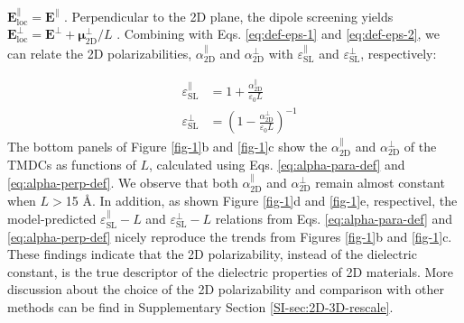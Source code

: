 \documentclass[journal=ancac3,manuscript=article,email=true,hyperref=true,keywords=false]{achemso}
\begin{document}
$\boldsymbol{E}^{\parallel}_{\mathrm{loc}}=\boldsymbol{E}^{\parallel}$
\cite{Markel_2016}. Perpendicular to the 2D plane, the dipole
screening yields
$\boldsymbol{E}_{\mathrm{loc}}^{\perp}=\boldsymbol{E}^{\perp}+\boldsymbol{\mu}_{\mathrm{2D}}^{\perp}/L$
\cite{Meyer_2001_dipole_slab,T_bik_2004}. Combining with
Eqs. \ref{eq:def-eps-1} and \ref{eq:def-eps-2}, we can relate the 2D polarizabilities,
$\alpha_{\mathrm{2D}}^{\parallel}$ and $\alpha_{\mathrm{2D}}^{\perp}$ with $\varepsilon_{\mathrm{SL}}^{\parallel}$ and $\varepsilon_{\mathrm{SL}}^{\perp}$, respectively:
\iffalse
\begin{subequations}
\begin{eqnarray}
  \label{eq:alpha-para-def}
  &\alpha_{\mathrm{2D}}^{\parallel} &= \varepsilon_{0}(\varepsilon_{\mathrm{SL}}^{\parallel} - 1)L\\
  \label{eq:alpha-perp-def}
  &\alpha_{\mathrm{2D}}^{\perp} &= \varepsilon_{0}\left(1 - {\displaystyle \frac{1}{\varepsilon_{\mathrm{SL}}^{\perp}}}\right)L
\end{eqnarray}
\end{subequations}
\fi
\begin{subequations}
\begin{eqnarray}
  \label{eq:alpha-para-def}
  &\varepsilon_{\mathrm{SL}}^{\parallel} &= 1 + \frac{\alpha_{\mathrm{2D}}^{\parallel}}{\varepsilon_{0}L}\\
  \label{eq:alpha-perp-def}
  &\varepsilon_{\mathrm{SL}}^{\perp} &= \left(1 - {\displaystyle \frac{\alpha_{\mathrm{2D}}^{\perp}}{\varepsilon_{\mathrm{0}} L}} \right)^{-1}
\end{eqnarray}
\end{subequations}
The bottom panels of Figure \ref{fig-1}b and \ref{fig-1}c show the
$\alpha_{\mathrm{2D}}^{\parallel}$ and $\alpha_{\mathrm{2D}}^{\perp}$
of the TMDCs as functions of $L$, calculated using
Eqs. \ref{eq:alpha-para-def} and \ref{eq:alpha-perp-def}. We observe
that both $\alpha_{\mathrm{2D}}^{\parallel}$ and
$\alpha_{\mathrm{2D}}^{\perp}$ remain almost constant when $L>$15
\AA{}. In addition, as shown Figure \ref{fig-1}d and \ref{fig-1}e,
respectivel, the model-predicted
$\varepsilon_{\mathrm{SL}}^{\parallel}-L$ and
$\varepsilon_{\mathrm{SL}}^{\perp}-L$ relations from Eqs.
\ref{eq:alpha-para-def} and \ref{eq:alpha-perp-def} nicely reproduce
the trends from Figures \ref{fig-1}b and \ref{fig-1}c. These findings
indicate that the 2D polarizability, instead of the dielectric
constant, is the true descriptor of the dielectric properties of 2D
materials. More discussion about the choice of the 2D polarizability
and comparison with other methods can be find in Supplementary Section
\ref{SI-sec:2D-3D-rescale}.
\end{document}
